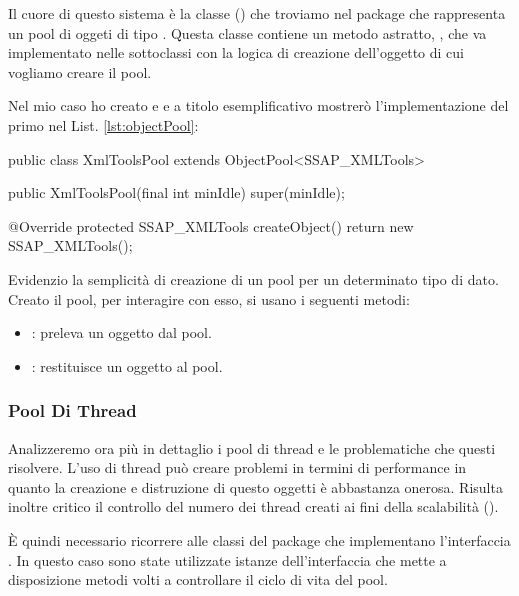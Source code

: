 Il cuore di questo sistema è la classe  (\cite{objectpool}) che troviamo nel package  che rappresenta un pool di oggeti di tipo . Questa classe contiene un metodo astratto, , che va implementato nelle sottoclassi con la logica di creazione dell'oggetto di cui vogliamo creare il pool.

Nel mio caso ho creato  e  e a titolo esemplificativo mostrerò l'implementazione del primo nel List. \ref{lst:objectPool}:

\begin{java}[caption={Implementazione di ObjectPool},label={lst:objectPool}]
public class XmlToolsPool extends ObjectPool<SSAP_XMLTools>{
	
	public XmlToolsPool(final int minIdle) {
		super(minIdle);
	}

	@Override
	protected SSAP_XMLTools createObject() {
		return new SSAP_XMLTools();
	}
}
\end{java}

\noindent
Evidenzio la semplicità di creazione di un pool per un determinato tipo di dato. Creato il pool, per interagire con esso, si usano i seguenti metodi:

\begin{itemize}
	\item {}: preleva un oggetto dal pool.
	\item {}: restituisce un oggetto al pool.
\end{itemize}

\subsubsection{Pool Di Thread}

Analizzeremo ora più in dettaglio i pool di thread e le problematiche che questi risolvere.
L'uso di thread può creare problemi in termini di performance in quanto la creazione e distruzione di questo oggetti è abbastanza onerosa. Risulta inoltre critico il controllo del numero dei thread creati ai fini della scalabilità (\cite{vetti2008}).

È quindi necessario ricorrere alle classi del package  che implementano l'interfaccia . In questo caso sono state utilizzate istanze dell'interfaccia  che mette a disposizione metodi volti a controllare il ciclo di vita del pool.


